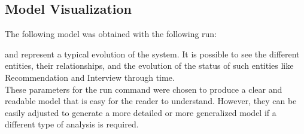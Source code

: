\subsection{Model Visualization}
The following model was obtained with the following run:

and represent a typical evolution of the system. It is possible to see the different entities, their relationships, and the evolution of the status of such entities like Recommendation and Interview through time.\\ 
These parameters for the run command were chosen to produce a clear and readable model that is easy for the reader to understand. However, they can be easily adjusted to generate a more detailed or more generalized model if a different type of analysis is required.

